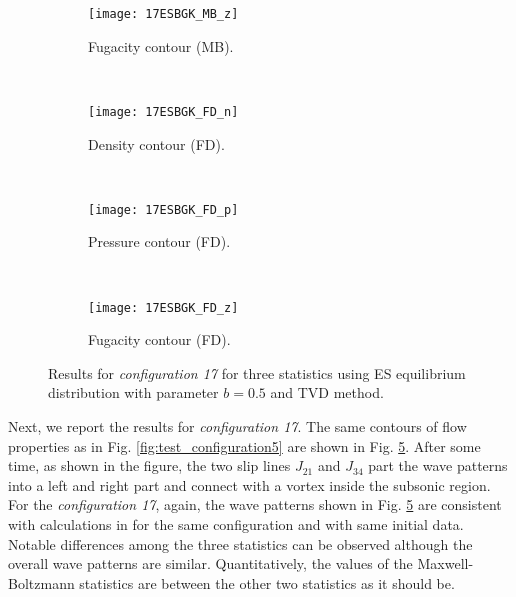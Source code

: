 \documentclass{rsproca}%
\begin{document}
\begin{figure}
\begin{subfigure}[b]{0.32\textwidth}
                \centering
                \texttt{[image: 17ESBGK\_MB\_z]}
                \caption{Fugacity contour (MB).}
                \label{fig:17ESBGK_MB_z}
        \end{subfigure}
        ~ %
        \begin{subfigure}[b]{0.32\textwidth}
                \centering
                \texttt{[image: 17ESBGK\_FD\_n]}
                \caption{Density contour (FD).}
                \label{fig:17ESBGK_FD_n}
        \end{subfigure}
        ~ %
        \begin{subfigure}[b]{0.32\textwidth}
                \centering
                \texttt{[image: 17ESBGK\_FD\_p]}
                \caption{Pressure contour (FD).}
                \label{fig:17ESBGK_FD_p}
        \end{subfigure}
				~ %
        \begin{subfigure}[b]{0.32\textwidth}
                \centering
                \texttt{[image: 17ESBGK\_FD\_z]}
                \caption{Fugacity contour (FD).}
                \label{fig:17ESBGK_FD_z}
        \end{subfigure}
				\caption{Results for \emph{configuration 17} for three statistics using ES equilibrium distribution with parameter $b=0.5$ and TVD method.} \label{fig:test_configuration17}
\end{figure}
Next, we report the results for \emph{configuration 17}. The same contours of flow properties as in Fig. \ref{fig:test_configuration5} are shown in Fig. \ref{fig:test_configuration17}.  After some time, as shown in the figure, the two slip lines $J_{21}$ and $J_{34}$ part the wave patterns into a left and right part and connect with a vortex inside the subsonic region.
For the \emph{configuration 17}, again, the wave patterns shown in Fig. \ref{fig:test_configuration17} are consistent with calculations in \cite{Laxliu95}\cite{schultzrinne} for the same configuration and with same initial data.   Notable differences among the three statistics can be observed although the overall wave patterns are similar.  Quantitatively, the values of the Maxwell-Boltzmann statistics are between the other two statistics as it should be.
\end{document}
